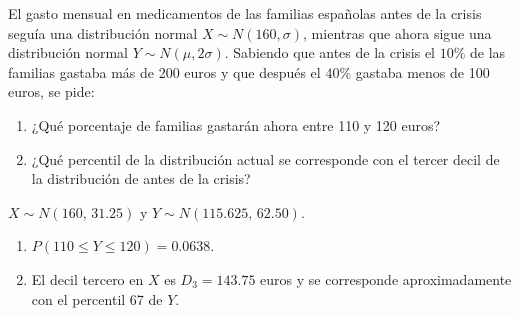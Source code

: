 {El gasto mensual en medicamentos de las familias españolas antes de la crisis seguía una distribución normal $X\sim
N(160,\sigma)$, mientras que ahora sigue una distribución normal $Y\sim N(\mu,2\sigma)$.
Sabiendo que antes de la crisis el $10\%$ de las familias gastaba más de 200 euros y que después el $40\%$ gastaba
menos de 100 euros, se pide:
\begin{enumerate}
\item ¿Qué porcentaje de familias gastarán ahora entre 110 y 120 euros?
\item ¿Qué percentil de la distribución actual se corresponde con el tercer decil de la distribución de antes de la crisis?
\end{enumerate}
}
{$X\sim N(160,\,31.25)$ y $Y\sim N(115.625,\,62.50)$.
\begin{enumerate}
\item $P(110\leq Y\leq 120)=0.0638$.
\item El decil tercero en $X$ es $D_3=143.75$ euros y se corresponde aproximadamente con el percentil 67 de $Y$.
\end{enumerate}
}
